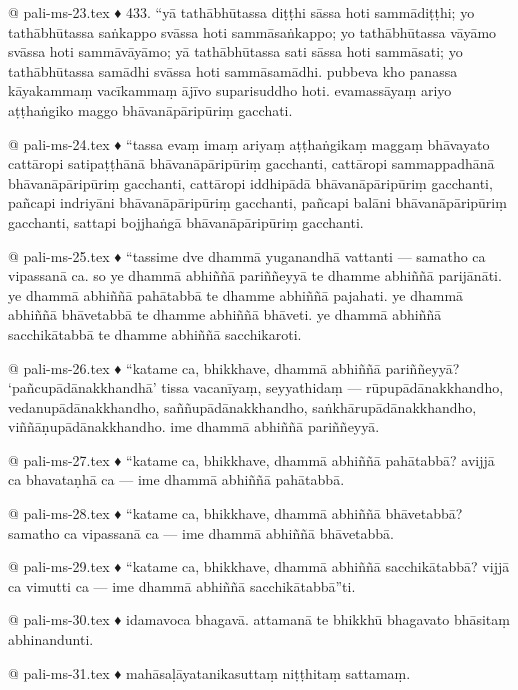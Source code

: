 @ pali-ms-23.tex
♦ 433. “yā tathābhūtassa diṭṭhi sāssa hoti sammādiṭṭhi; yo tathābhūtassa saṅkappo svāssa hoti sammāsaṅkappo; yo tathābhūtassa vāyāmo svāssa hoti sammāvāyāmo; yā tathābhūtassa sati sāssa hoti sammāsati; yo tathābhūtassa samādhi svāssa hoti sammāsamādhi. pubbeva kho panassa kāyakammaṃ vacīkammaṃ ājīvo suparisuddho hoti. evamassāyaṃ ariyo aṭṭhaṅgiko maggo bhāvanāpāripūriṃ gacchati.

@ pali-ms-24.tex
♦ “tassa evaṃ imaṃ ariyaṃ aṭṭhaṅgikaṃ maggaṃ bhāvayato cattāropi satipaṭṭhānā bhāvanāpāripūriṃ gacchanti, cattāropi sammappadhānā bhāvanāpāripūriṃ gacchanti, cattāropi iddhipādā bhāvanāpāripūriṃ gacchanti, pañcapi indriyāni bhāvanāpāripūriṃ gacchanti, pañcapi balāni bhāvanāpāripūriṃ gacchanti, sattapi bojjhaṅgā bhāvanāpāripūriṃ gacchanti.

@ pali-ms-25.tex
♦ “tassime dve dhammā yuganandhā vattanti — samatho ca vipassanā ca. so ye dhammā abhiññā pariññeyyā te dhamme abhiññā parijānāti. ye dhammā abhiññā pahātabbā te dhamme abhiññā pajahati. ye dhammā abhiññā bhāvetabbā te dhamme abhiññā bhāveti. ye dhammā abhiññā sacchikātabbā te dhamme abhiññā sacchikaroti.

@ pali-ms-26.tex
♦ “katame ca, bhikkhave, dhammā abhiññā pariññeyyā? ‘pañcupādānakkhandhā’ tissa vacanīyaṃ, seyyathidaṃ — rūpupādānakkhandho, vedanupādānakkhandho, saññupādānakkhandho, saṅkhārupādānakkhandho, viññāṇupādānakkhandho. ime dhammā abhiññā pariññeyyā.

@ pali-ms-27.tex
♦ “katame ca, bhikkhave, dhammā abhiññā pahātabbā? avijjā ca bhavataṇhā ca — ime dhammā abhiññā pahātabbā.

@ pali-ms-28.tex
♦ “katame ca, bhikkhave, dhammā abhiññā bhāvetabbā? samatho ca vipassanā ca — ime dhammā abhiññā bhāvetabbā.

@ pali-ms-29.tex
♦ “katame ca, bhikkhave, dhammā abhiññā sacchikātabbā? vijjā ca vimutti ca — ime dhammā abhiññā sacchikātabbā”ti.

@ pali-ms-30.tex
♦ idamavoca bhagavā. attamanā te bhikkhū bhagavato bhāsitaṃ abhinandunti.

@ pali-ms-31.tex
♦ mahāsaḷāyatanikasuttaṃ niṭṭhitaṃ sattamaṃ.
